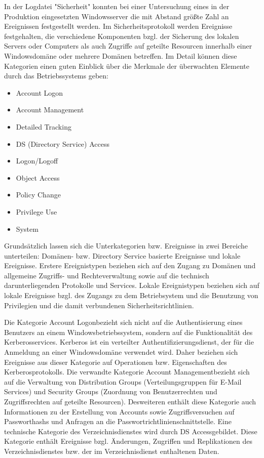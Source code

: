 In der Logdatei "Sicherheit" konnten bei einer Untersuchung eines in der Produktion eingesetzten Windowsserver die mit Abstand größte Zahl an Ereignissen festgestellt werden. Im Sicherheitsprotokoll werden Ereignisse festgehalten, die verschiedene Komponenten bzgl. der Sicherung des lokalen Servers oder Computers als auch Zugriffe auf geteilte Resourcen innerhalb einer Windowsdomäne oder mehrere Domänen betreffen. Im Detail können diese Kategorien einen guten Einblick über die Merkmale der überwachten Elemente durch das Betriebssystems geben:
\begin{itemize}
\item Account Logon
\item Account Management
\item Detailed Tracking
\item DS (Directory Service) Access
\item Logon/Logoff
\item Object Access
\item Policy Change
\item Privilege Use
\item System
\end{itemize}
Grundsätzlich lassen sich die Unterkategorien bzw. Ereignisse in zwei Bereiche unterteilen: Domänen- bzw. Directory Service basierte Ereignisse und lokale Ereignisse. Erstere Ereignistypen beziehen sich auf den Zugang zu Domänen und allgemeine Zugriffs- und Rechteverwaltung sowie auf die technisch darunterliegenden Protokolle und Services. Lokale Ereignistypen beziehen sich auf lokale Ereignisse bzgl. des Zugangs zu dem Betriebsystem und die Benutzung von Privilegien und die damit verbundenen Sicherheitsrichtlinien.

Die Kategorie \glqq Account Logon\grqq  bezieht sich nicht auf die Authentisierung eines Benutzers an einem Windowsbetriebssystem, sondern auf die Funktionalität des Kerberosservices. Kerberos ist ein verteilter Authentifizierungsdienst, der für die Anmeldung an einer Windowsdomäne verwendet wird.  Daher beziehen sich Ereignisse aus dieser Kategorie auf Operationen bzw. Eigenschaften des Kerberosprotokolls. Die verwandte Kategorie \glqq Account Management\grqq  bezieht sich auf die Verwaltung von Distribution Groups (Verteilungsgruppen für E-Mail Services) und Security Groups (Zuordnung von Benutzerrechten und Zugriffsrechten auf geteilte Resourcen). Desweiteren enthält diese Kategorie auch Informationen zu der Erstellung von Accounts sowie Zugriffsversuchen auf Passworthashs und Anfragen an die Passwortrichtlinienschnittstelle. 
Eine technische Kategorie des Verzeichnisdienstes wird durch \glqq DS Access\grqq   gebildet. Diese Kategorie enthält Ereignisse bzgl. Änderungen, Zugriffen und Replikationen des Verzeichnisdienstes bzw. der im Verzeichnisdienst enthaltenen Daten.

